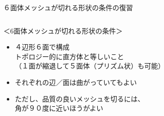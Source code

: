 \begin{frame}{６面体メッシュが切れる形状の条件の復習}
   \begin{columns}[t]
    \begin{column}{0.7\textwidth}
      ＜6面体メッシュが切れる形状の条件＞
      \begin{itemize}
        \item[(1)] ４辺形６面で構成 \\
	           トポロジー的に直方体と等しいこと \\
		   （１面が縮退して５面体（プリズム状）も可能）
	\item[(2)] それぞれの辺／面は曲がっていてもよい
	\item[(3)] ただし、品質の良いメッシュを切るには、\\
		   角が９０度に近いほうがよい
      \end{itemize}
    \end{column}
    \begin{column}{0.3\textwidth}
    \end{column}
  \end{columns}
\end{frame}
